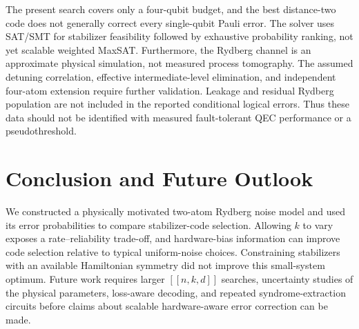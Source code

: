 The present search covers only a four-qubit budget, and the best
distance-two code does not generally correct every single-qubit Pauli
error. The solver uses SAT/SMT for stabilizer feasibility followed by
exhaustive probability ranking, not yet scalable weighted MaxSAT.
Furthermore, the Rydberg channel is an approximate physical simulation,
not measured process tomography. The assumed detuning correlation,
effective intermediate-level elimination, and independent four-atom
extension require further validation. Leakage and residual Rydberg
population are not included in the reported conditional logical errors.
Thus these data should not be identified with measured fault-tolerant
QEC performance or a pseudothreshold.

\section{Conclusion and Future Outlook}
\label{sec:conclusion}
We constructed a physically motivated two-atom Rydberg noise model and
used its error probabilities to compare stabilizer-code selection.
Allowing $k$ to vary exposes a rate--reliability trade-off, and
hardware-bias information can improve code selection relative to typical
uniform-noise choices. Constraining stabilizers with an available
Hamiltonian symmetry did not improve this small-system optimum.
Future work requires larger $[[n,k,d]]$ searches, uncertainty studies
of the physical parameters, loss-aware decoding, and repeated
syndrome-extraction circuits before claims about scalable hardware-aware
error correction can be made.
